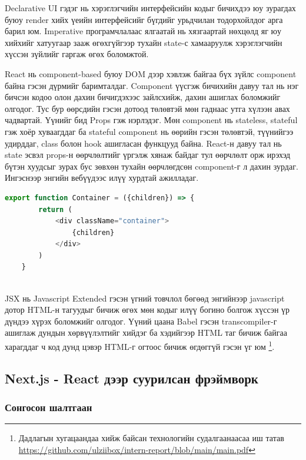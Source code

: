 Declarative UI гэдэг нь хэрэглэгчийн интерфейсийн кодыг бичихдээ юу зурагдах буюу render хийх үеийн интерфейсийг бүгдийг урьдчилан тодорхойлдог арга барил юм. Imperative програмчлалаас ялгаатай нь хязгаартай нөхцөлд яг юу хийхийг хатуугаар зааж өгөхгүйгээр тухайн state-с хамааруулж хэрэглэгчийн хүссэн зүйлийг гаргаж өгөх боломжтой.   

React нь component-based буюу DOM дээр хэвлэж байгаа бүх зүйлс component байна гэсэн дүрмийг баримталдаг. Component үүсгэж бичихийн давуу тал нь нэг бичсэн кодоо олон дахин бичигдэхээс зайлсхийж, дахин ашиглах боломжийг олгодог. Тус бур өөрсдийн гэсэн дотоод төлөвтэй мөн гаднаас утга хүлээн авах чадвартай. Үүнийг бид Props гэж нэрлэдэг. Мөн component нь stateless, stateful гэж хоёр хуваагддаг ба stateful component нь өөрийн гэсэн төлөвтэй, түүнийгээ удирддаг, class болон hook ашигласан функцууд байна. React-н давуу тал нь state эсвэл props-н өөрчлөлтийг үргэлж хянаж байдаг тул өөрчлөлт орж ирэхэд бүтэн хуудсыг зурах бус зөвхөн тухайн өөрчлөгдсөн component-г л дахин зурдаг. Ингэснээр энгийн вебүүдээс илүү хурдтай ажилладаг.

\begin{lstlisting}[language=Javascript, caption=JSX ашиглаж 'container' класстай html элемент буцаах компонент, frame=single]
	export function Container = ({children}) => {
		return (
			<div className="container">
				{children}
			</div>
		)
	}
			
\end{lstlisting}

JSX нь Javascript Extended гэсэн үгний товчлол бөгөөд энгийнээр javascript дотор HTML-н тагуудыг бичиж өгөх мөн кодыг илүү богино болгож хүссэн үр дүндээ хүрэх боломжийг олгодог. Үүний цаана Babel гэсэн transcompiler-г ашиглаж дундын хөрвүүлэлтийг хийдэг ба хэдийгээр HTML таг бичиж байгаа харагддаг ч код дунд цэвэр HTML-г огтоос бичиж өгдөггүй гэсэн үг юм \footnote{Дадлагын хугацаандаа хийж байсан технологийн судалгаанаасаа иш татав \url{https://github.com/ulziibox/intern-report/blob/main/main.pdf}}. 


\subsection{Next.js - React дээр суурилсан фрэймворк}

\subsubsection{Сонгосон шалтгаан}

